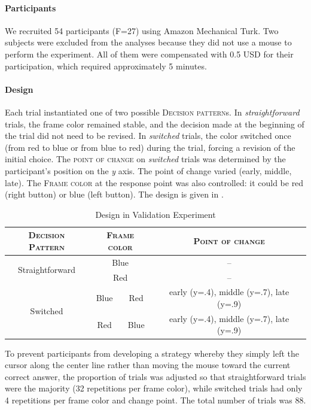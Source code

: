 \documentclass{article}
\begin{document}
\paragraph{Participants} We recruited 54 participants (F=27) using Amazon Mechanical Turk. Two subjects were excluded from the analyses because they did not use a mouse to perform the experiment. All of them were compensated with 0.5 USD for their participation, which required approximately 5 minutes. 

\paragraph{Design}
Each trial instantiated one of two possible \textsc{Decision pattern}s. In \textit{straightforward} trials, the frame color remained stable, and the decision made at the beginning of the trial did not need to be revised. In \textit{switched} trials, the color switched once (from red to blue or from blue to red) during the trial, forcing a revision of the initial choice. 
The \textsc{point of change} on \textit{switched} trials was determined by the participant's position on the \textit{y} axis. The point of change varied (early, middle, late). 
The \textsc{Frame color} at the response point was also controlled: it could be red (right button) or blue (left button).    
The design is given in . 


\begin{table}[!h]
\centering
\begin{tabular}{c|cc|c}
\textsc{Decision Pattern}&\multicolumn{2}{c|}{\textsc{Frame color}}&\textsc{Point of change}\\
\hline
\multirow{2}{*}{Straightforward} & \multicolumn{2}{c|}{Blue} & -- \\
& \multicolumn{2}{c|}{Red} & -- \\
\hline
\multirow{2}{*}{Switched} &Blue & Red & early (y=.4), middle (y=.7), late (y=.9) \\
 &  Red &  Blue & early (y=.4), middle (y=.7), late (y=.9) \\
\hline
\end{tabular}
\caption{Design in Validation Experiment}
\label{tab:design.validation}
\end{table}

To prevent participants from developing a strategy whereby they simply left the cursor along the center line rather than moving the mouse toward the current correct answer, the proportion of trials was adjusted so that straightforward trials were the majority (32 repetitions per frame color), while switched trials had only 4 repetitions per frame color and change point. The total number of trials was 88.  
\end{document}
